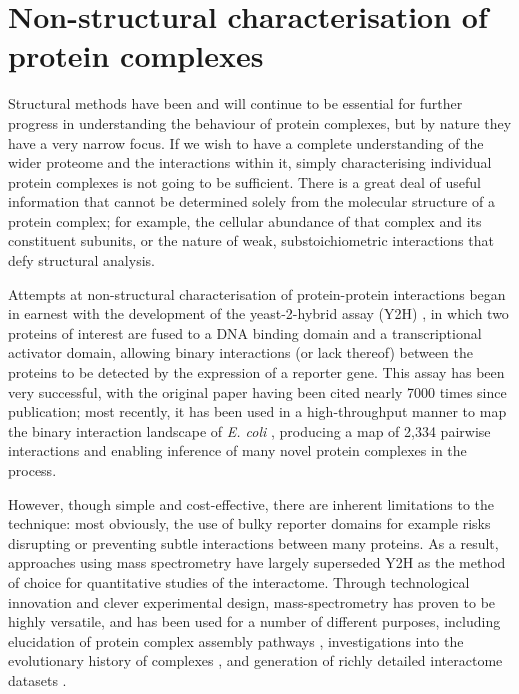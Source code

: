 \documentclass[a4paper,11pt,twoside,openright]{scrbook}
\begin{document}
\section{Non-structural characterisation of protein complexes}
Structural methods have been and will continue to be essential for further progress in understanding the behaviour of protein complexes, but by nature they have a very narrow focus. If we wish to have a complete understanding of the wider proteome and the interactions within it, simply characterising individual protein complexes is not going to be sufficient. There is a great deal of useful information that cannot be determined solely from the molecular structure of a protein complex; for example, the cellular abundance of that complex and its constituent subunits, or the nature of weak, substoichiometric interactions that defy structural analysis.

Attempts at non-structural characterisation of protein-protein interactions began in earnest with the development of the yeast-2-hybrid assay (Y2H) \cite{Fields1989}, in which two proteins of interest are fused to a DNA binding domain and a transcriptional activator domain, allowing binary interactions (or lack thereof) between the proteins to be detected by the expression of a reporter gene. This assay has been very successful, with the original paper having been cited nearly 7000 times since publication; most recently, it has been used in a high-throughput manner to map the binary interaction landscape of \textit{E. coli} \cite{Rajagopala2014}, producing a map of 2,334 pairwise interactions and enabling inference of many novel protein complexes in the process.

However, though simple and cost-effective, there are inherent limitations to the technique: most obviously, the use of bulky reporter domains for example risks disrupting or preventing subtle interactions between many proteins. As a result, approaches using mass spectrometry have largely superseded Y2H as the method of choice for quantitative studies of the interactome. Through technological innovation and clever experimental design, mass-spectrometry has proven to be highly versatile, and has been used for a number of different purposes, including elucidation of protein complex assembly pathways \cite{Levy2008,Marsh2013}, investigations into the evolutionary history of complexes \cite{Wan2015}, and generation of richly detailed interactome datasets \cite{Hein2015}.
\end{document}

